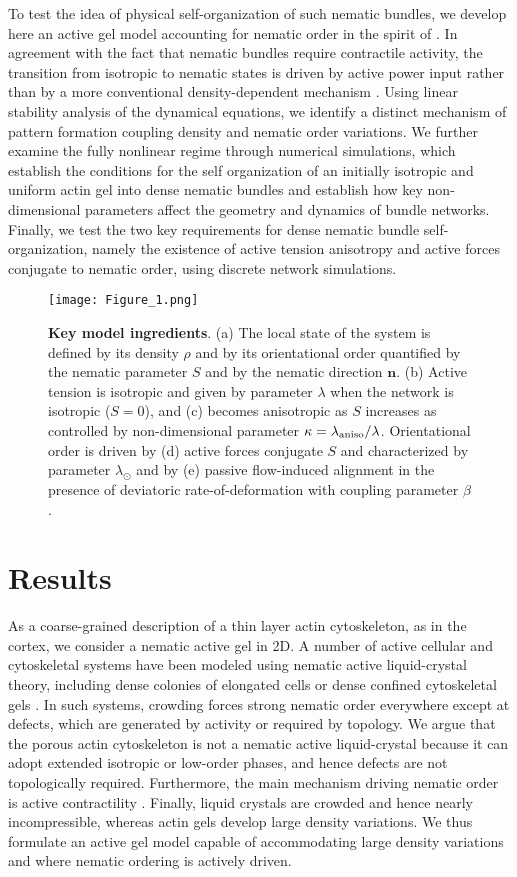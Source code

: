 	To test the idea of physical self-organization of such nematic bundles, we develop here an active gel model accounting for nematic order in the spirit of \cite{salbreux2009,anne2016,julicher2018}. In agreement with the fact that nematic bundles require contractile activity, the transition from isotropic to nematic states is driven by active power input rather than by a more conventional density-dependent mechanism \cite{e2011}. Using linear stability analysis of the dynamical equations, we identify a distinct mechanism of pattern formation coupling density and nematic order variations. We further examine the fully nonlinear regime through numerical simulations, which establish the conditions for the self organization of an initially isotropic and uniform actin gel into dense nematic bundles and establish how key non-dimensional parameters affect the geometry and dynamics of bundle networks. Finally, we test the two key requirements for dense nematic bundle self-organization, namely the existence of active tension anisotropy and active forces conjugate to nematic order, using discrete network simulations. 	
    \begin{figure}[H]
		\centering
		\texttt{[image: Figure\_1.png]}
		\caption{{\bf Key model ingredients}. (a) The local state of the system is defined by its density $\rho$ and by its orientational order quantified by the nematic parameter $S$ and by the nematic direction $\bm{n}$.  (b) Active tension is isotropic and given by parameter $\lambda$ when the network is isotropic ($S=0$), and (c) becomes anisotropic as $S$ increases as controlled by non-dimensional parameter $\kappa = \lambda_{\rm aniso}/\lambda$. Orientational order is driven by (d) active forces conjugate $S$ and characterized by parameter $\lambda_{\odot}$ and by (e) passive flow-induced alignment in the presence of deviatoric rate-of-deformation with coupling parameter $\beta$.}
		\label{fig4.1}
	\end{figure} 

	\section{Results}
		As a coarse-grained description of a thin layer actin cytoskeleton, as in the cortex, we consider a nematic active gel in 2D. A number of active cellular and cytoskeletal systems have been modeled using nematic active liquid-crystal theory, including dense colonies of elongated cells or dense confined cytoskeletal gels \cite{giomi2014,duclos2017,kumar2018}. In such systems, crowding forces strong nematic order everywhere except at defects, which are generated by activity or required by topology. We argue that the porous actin cytoskeleton is not a nematic active liquid-crystal because it can adopt extended isotropic or low-order phases, and hence defects are not topologically required. Furthermore, the main mechanism driving nematic order is active contractility \cite{hotulainen2006}. Finally, liquid crystals are crowded and hence nearly incompressible, whereas actin gels develop large density variations.  We thus formulate an active gel model capable of accommodating large density variations and where nematic ordering is actively driven. 
	
